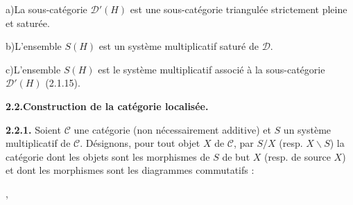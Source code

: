 \par\noindent\hspace*{2em}a)\enspace La sous-catégorie $\mathcal D'(H)$ est
une sous-catégorie triangulée strictement pleine et saturée.

\par\noindent\hspace*{2em}b)\enspace L'ensemble $S(H)$ est un système
multiplicatif saturé de $\mathcal D$.

\par\noindent\hspace*{2em}c)\enspace L'ensemble $S(H)$ est le système
multiplicatif associé à la sous-catégorie $\mathcal D'(H)$ (2.1.15).
\par\endgroup

\medskip
\noindent\textbf{2.2.\quad Construction de la catégorie localisée.}

\smallskip
\noindent\textbf{2.2.1.}\quad
{}%
Soient $\mathcal C$ une catégorie (non nécessairement additive) et $S$ un
système multiplicatif de $\mathcal C$. Désignons, pour tout objet $X$ de
$\mathcal C$, par $S/X$ (resp. $X\backslash S$) la catégorie dont les objets
sont les morphismes de $S$ de but $X$ (resp. de source $X$)
%
et dont les morphismes sont les diagrammes commutatifs :

\begin{center}
  \quad ,
\end{center}

\endgroup

